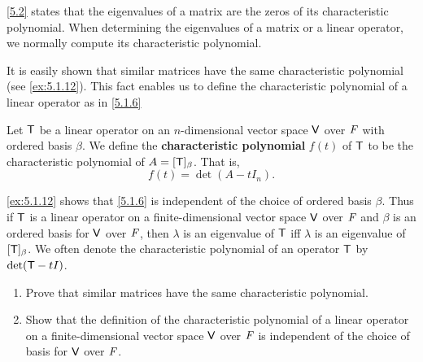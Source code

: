 \begin{note}
  \cref{5.2} states that the eigenvalues of a matrix are the zeros of its characteristic polynomial.
  When determining the eigenvalues of a matrix or a linear operator, we normally compute its characteristic polynomial.
\end{note}

\begin{note}
  It is easily shown that similar matrices have the same characteristic polynomial (see \cref{ex:5.1.12}).
  This fact enables us to define the characteristic polynomial of a linear operator as in \cref{5.1.6}
\end{note}

\begin{defn}\label{5.1.6}
  Let \(\mathsf{T}\) be a linear operator on an \(n\)-dimensional vector space \(\mathsf{V}\) over \(\mathit{F}\) with ordered basis \(\beta\).
  We define the \textbf{characteristic polynomial} \(f(t)\) of \(\mathsf{T}\) to be the characteristic polynomial of \(A = [\mathsf{T}]_{\beta}\).
  That is,
  \[
    f(t) = \det(A - t I_n).
  \]
\end{defn}

\begin{note}
  \cref{ex:5.1.12} shows that \cref{5.1.6} is independent of the choice of ordered basis \(\beta\).
  Thus if \(\mathsf{T}\) is a linear operator on a finite-dimensional vector space \(\mathsf{V}\) over \(\mathit{F}\) and \(\beta\) is an ordered basis for \(\mathsf{V}\) over \(\mathit{F}\), then \(\lambda\) is an eigenvalue of \(\mathsf{T}\) iff \(\lambda\) is an eigenvalue of \([\mathsf{T}]_{\beta}\).
  We often denote the characteristic polynomial of an operator \(\mathsf{T}\) by \(\det(\mathsf{T} - tI)\).
\end{note}

\exercisesection

\begin{ex}\label{ex:5.1.12}
  \begin{enumerate}
    \item Prove that similar matrices have the same characteristic polynomial.
    \item Show that the definition of the characteristic polynomial of a linear operator on a finite-dimensional vector space \(\mathsf{V}\) over \(\mathit{F}\) is independent of the choice of basis for \(\mathsf{V}\) over \(\mathit{F}\).
  \end{enumerate}
\end{ex}

